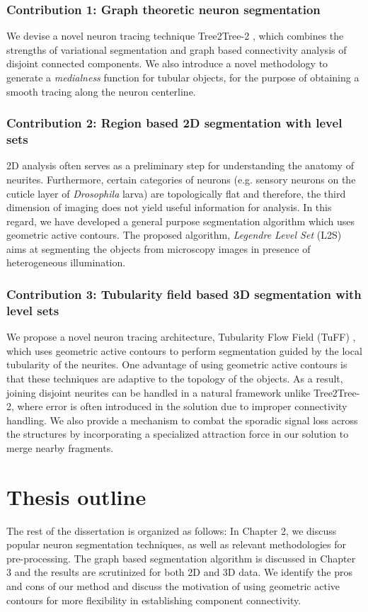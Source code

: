 \subsubsection*{Contribution 1: Graph theoretic neuron segmentation}

We devise a novel neuron tracing technique Tree2Tree-2 \cite{mukherjee_T2T_2}, which combines the strengths of variational segmentation and graph based connectivity analysis of disjoint connected components. We also introduce a novel methodology to generate a \textit{medialness} function \cite{mukherjee_medialness} for tubular objects, for the purpose of obtaining a smooth tracing along the neuron centerline.

\subsubsection*{Contribution 2: Region based 2D segmentation with level sets}
2D analysis often serves as a preliminary step for understanding the anatomy of neurites. Furthermore, certain categories of neurons (e.g. sensory neurons on the cuticle layer of \textit{Drosophila} larva) are topologically flat and therefore, the third dimension of imaging does not yield useful information for analysis. In this regard, we have developed a general purpose segmentation algorithm which uses geometric active contours. The proposed algorithm, \textit{Legendre Level Set} (L2S)\cite{mukherjee_L2S} aims at segmenting the objects from microscopy images in presence of heterogeneous illumination. 

\subsubsection*{Contribution 3: Tubularity field based 3D segmentation with level sets}
We propose a novel neuron tracing architecture, Tubularity Flow Field (TuFF) \cite{mukherjee_TuFF}, which uses geometric active contours to perform segmentation guided by the local tubularity of the neurites. One advantage of using geometric active contours is that these techniques are adaptive to the topology of the objects. As a result, joining disjoint neurites can be handled in a natural framework unlike Tree2Tree-2, where error is often introduced in the solution due to improper connectivity handling. We also provide a mechanism to combat the sporadic signal loss across the structures by incorporating a specialized attraction force in our solution to merge nearby fragments. 

\section{Thesis outline}
The rest of the dissertation is organized as follows: In Chapter 2, we discuss popular neuron segmentation techniques, as well as relevant methodologies for pre-processing.  
The graph based segmentation algorithm is discussed in Chapter 3 and the results are scrutinized for both 2D and 3D data. We identify the pros and cons of our method and discuss the motivation of using geometric active contours for more flexibility in establishing component connectivity. 

